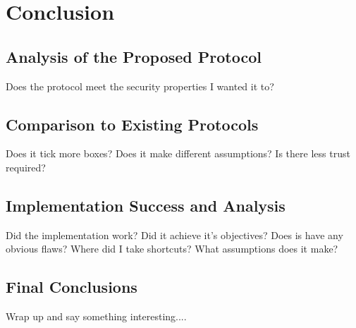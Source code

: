 
\chapter{Conclusion}
\label{ch:conclusion}

\section{Analysis of the Proposed Protocol}
\label{ch:conclusion:analysis}

Does the protocol meet the security properties I wanted it to?

\section{Comparison to Existing Protocols}
\label{ch:conclusion:comparison}

Does it tick more boxes? Does it make different assumptions? Is there less trust required?

\section{Implementation Success and Analysis}
\label{ch:conclusion:impl}

Did the implementation work? Did it achieve it's objectives?
Does is have any obvious flaws? Where did I take shortcuts?
What assumptions does it make?

\section{Final Conclusions}
\label{ch:conclusion:final}

Wrap up and say something interesting....
